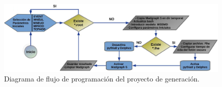 


\begin{figure}[!ht]
\centering
\includegraphics[width=1\textwidth]{Cap3/imagenes/proceso_genera_darksusy.png}
\caption{Diagrama de flujo de programación del proyecto de generación.}
\label{genera_darksusy2}
\end{figure}

